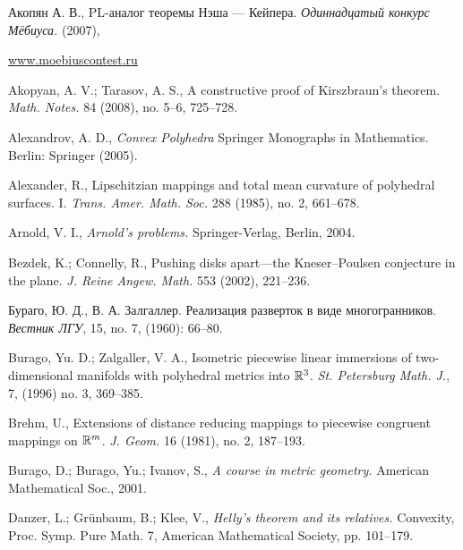 \begin{thebibliography}{52}


\begin{otherlanguage}{russian}
Акопян А. В.,
PL-аналог теоремы Нэша --- Кейпера.
\textit{Одиннадцатый конкурс Мёбиуса.} (2007),
\end{otherlanguage}
\href{http://www.moebiuscontest.ru/files/2007/akopyan.pdf}{www.moebiuscontest.ru}

Akopyan, A. V.; 
Tarasov, A. S.,
A constructive proof of Kirszbraun's theorem. 
\textit{Math. Notes.} 84 (2008), no. 5--6, 725--728.

Alexandrov, A. D.,
\textit{Convex Polyhedra}
Springer Monographs in Mathematics. Berlin: Springer (2005).


Alexander, R., 
Lipschitzian mappings and total mean curvature of polyhedral surfaces. I.
\textit{Trans. Amer. Math. Soc.} 288 (1985), no. 2, 661--678.

Arnold, V. I., 
\textit{Arnold's problems.} 
Springer-Verlag, Berlin, 2004. 

Bezdek, K.;  
Connelly, R., 
Pushing disks apart---the Kneser--Poulsen conjecture in the plane.  
\textit{J. Reine Angew. Math.}  553  (2002), 221--236.

\begin{otherlanguage}{russian}
Бураго, Ю. Д., 
В. А. Залгаллер. 
Реализация разверток в виде многогранников. \textit{Вестник ЛГУ}, 15, no. 7, (1960): 66--80.
\end{otherlanguage}

Burago, Yu. D.; 
Zalgaller, V. A., 
Isometric piecewise linear immersions of two-dimensional manifolds with polyhedral metrics into $\mathbb{R}^3$.
\textit{St. Petersburg Math. J.}, 
7, (1996) no. 3, 369--385.

 Brehm, U., 
Extensions of distance reducing mappings to piecewise congruent mappings on $\mathbb{R}^m$.  
\textit{J. Geom.}  16  (1981), no. 2, 187--193.

Burago, D.;  
Burago, Yu.;  
Ivanov, S.,
\textit{A course in metric geometry.}
American Mathematical Soc., 2001.

Danzer, L.; 
Gr\"unbaum, B.; 
Klee, V.,
\textit{Helly's theorem and its relatives.} 
Convexity, Proc. Symp. Pure Math. 7, American Mathematical Society, pp. 101--179.


\end{thebibliography}
